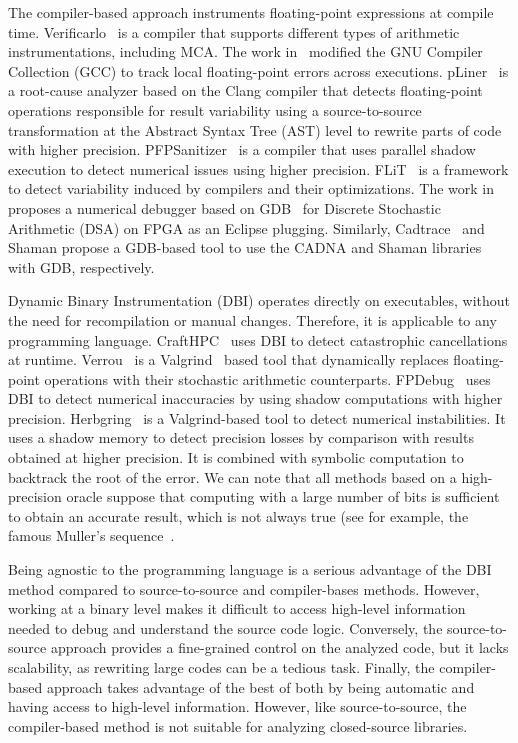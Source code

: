 \documentclass[11pt]{article}
\newcommand{\tristan}[1]{\color{orange}\textbf{From Tristan:} #1\color{black}\xspace}
\begin{document}
The compiler-based approach instruments floating-point expressions at compile time. 
Verificarlo~\cite{verificarlo} is a compiler that supports different types of arithmetic instrumentations, including MCA. 
The work in~\cite{bao2013fly} modified the GNU Compiler Collection (GCC) to track local floating-point errors across executions. pLiner~\cite{guo2020pliner} is a root-cause analyzer based on the Clang compiler that detects floating-point operations responsible for result variability using a source-to-source transformation at the Abstract Syntax Tree (AST) level to rewrite parts of code with higher precision. 
PFPSanitizer~\cite{chowdhary2020debugging,chowdhary2021parallel} is a compiler that uses parallel shadow execution to detect numerical issues using higher precision.
FLiT~\cite{sawaya2017flit} is a framework to detect variability induced by compilers and their optimizations.
The work in~\cite{wang2012development} proposes a numerical debugger based on GDB~\cite{stallman1988debugging} for Discrete Stochastic Arithmetic (DSA) on FPGA as an Eclipse plugging. Similarly, Cadtrace~\cite{jezequel2008cadna} and Shaman propose a GDB-based tool to use the CADNA and Shaman libraries with GDB, respectively.

Dynamic Binary Instrumentation (DBI) operates directly on executables, without the need for recompilation or manual changes. Therefore, it is applicable to any programming language.
CraftHPC~\cite{lam2013dynamic} uses DBI to detect catastrophic cancellations at runtime.
Verrou~\cite{fevotte2016verrou} is a Valgrind~\cite{nethercote2007valgrind} based tool that dynamically replaces
floating-point operations with their stochastic arithmetic counterparts. FPDebug~\cite{benz2012dynamic} uses DBI to detect numerical inaccuracies by using shadow computations with higher precision.
Herbgring~\cite{sanchez2017finding} is a Valgrind-based tool to detect
numerical instabilities. It uses a shadow memory to detect precision losses by comparison with results obtained at higher precision. It is combined with symbolic computation to backtrack the root of the error.
We can note that all methods based on a high-precision oracle suppose that computing with a large number of bits is sufficient to obtain an accurate result, which is not always true (see for example, the famous Muller's sequence~\cite{bajard1996introduction}. %

Being agnostic to the programming language is a serious advantage of the DBI method compared to source-to-source and compiler-bases methods. However, working at a binary level makes it difficult to access high-level information needed to debug and understand the source code logic. Conversely, the source-to-source approach provides a fine-grained control on the analyzed code, but it lacks scalability, as rewriting large codes can be a tedious task. Finally, the compiler-based approach takes advantage of the best of both by being automatic and having access to high-level information. However, like source-to-source, the compiler-based method is not suitable for analyzing closed-source libraries.
\end{document}
